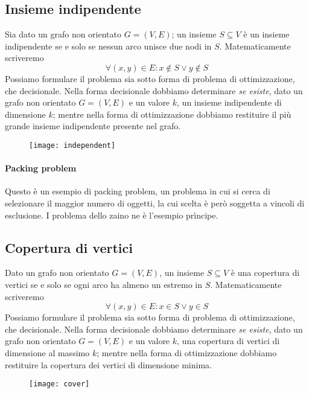 \begin{minipage}[c]{.7\textwidth}
\subsection{Insieme indipendente}

Sia dato un grafo non orientato \(G = (V,E)\); un insieme \(S \subseteq V\) è un insieme indipendente se e solo se nessun arco unisce due nodi in \(S\).
Matematicamente scriveremo
\[
    \forall (x,y) \in E : x \not\in S \lor y \not\in S
\]
Possiamo formulare il problema sia sotto forma di problema di ottimizzazione, che decisionale.
Nella forma decisionale dobbiamo determinare \emph{se esiste}, dato un grafo non orientato \(G = (V,E)\) e un valore \(k\), un insieme indipendente di dimensione \(k\); mentre nella forma di ottimizzazione dobbiamo restituire il più grande insieme indipendente presente nel grafo.
\end{minipage}%
\begin{minipage}[c]{.3\textwidth}
\begin{figure}[H]\centering
	\texttt{[image: independent]}
\end{figure}
\end{minipage}

\paragraph{Packing problem}
Questo è un esempio di packing problem, un problema in cui si cerca di selezionare il maggior numero di oggetti, la cui scelta è però soggetta a vincoli di esclusione.
I problema dello zaino ne è l'esempio prìncipe.

\begin{minipage}[c]{.7\textwidth}
\subsection{Copertura di vertici}

Dato un grafo non orientato \(G = (V,E)\), un insieme \(S \subseteq V\) è una copertura di vertici se e solo se ogni arco ha almeno un estremo in \(S\).
Matematicamente scriveremo
\[
    \forall (x,y) \in E : x \in S \lor y \in S
\]
Possiamo formulare il problema sia sotto forma di problema di ottimizzazione, che decisionale.
Nella forma decisionale dobbiamo determinare \emph{se esiste}, dato un grafo non orientato \(G = (V,E)\) e un valore \(k\), una copertura di vertici di dimensione al massimo \(k\); mentre nella forma di ottimizzazione dobbiamo restituire la copertura dei vertici di dimensione minima.
\end{minipage}%
\begin{minipage}[c]{.3\textwidth}
\begin{figure}[H]\centering
	\texttt{[image: cover]}
\end{figure}
\end{minipage}

